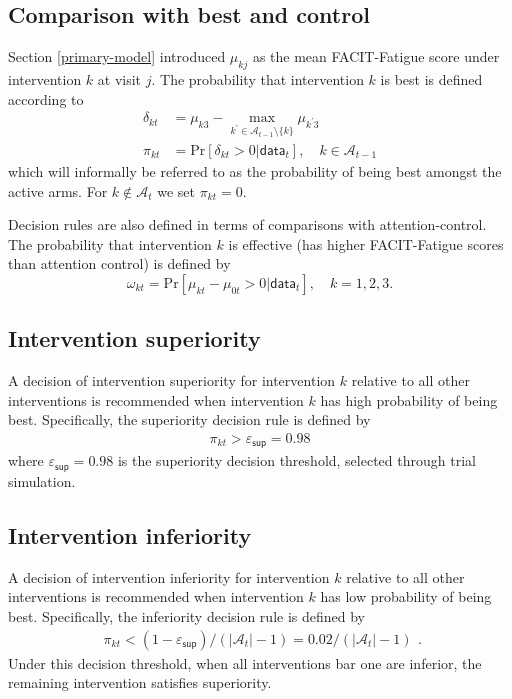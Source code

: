 \documentclass[11pt,parskip=half-]{scrartcl}
\begin{document}
\subsection{Comparison with best and control}\label{comparison-wth-best}

Section \ref{primary-model} introduced $\mu_{kj}$ as the mean FACIT-Fatigue score under intervention $k$ at visit $j$. The probability that intervention $k$ is best is defined according to
$$
  \begin{aligned}
    \delta_{kt} & = \mu_{k3} - \underset{k^\prime\in\mathcal{A}_{t-1}\setminus\{k\}}{\max}\mu_{k^\prime 3} \\
    \pi_{kt}    & = \text{Pr}[\delta_{kt}>0|\mathsf{data}_t], \quad k \in \mathcal{A}_{t-1}
  \end{aligned}
$$
which will informally be referred to as the probability of being best amongst the active arms. For $k\notin\mathcal{A}_t$ we set $\pi_{kt}=0$.

Decision rules are also defined in terms of comparisons with attention-control. The probability that intervention $k$ is effective (has higher FACIT-Fatigue scores than attention control) is defined by
$$
  \omega_{kt} = \text{Pr}[\mu_{kt} - \mu_{0t} > 0 | \mathsf{data}_t], \quad k =1,2,3.
$$

\subsection{Intervention superiority}\label{intervention-superiority}

A decision of intervention superiority for intervention $k$ relative to all other interventions is recommended when intervention $k$ has high probability of being best. Specifically, the superiority decision rule is defined by
$$
  \begin{aligned}
    \pi_{kt} > \varepsilon_{\mathsf{sup}} = 0.98
  \end{aligned}
$$
where $\varepsilon_{\mathsf{sup}} = 0.98$ is the superiority decision threshold, selected through trial simulation.

\subsection{Intervention inferiority}\label{trinterventioneatment-inferiority}

A decision of intervention inferiority for intervention $k$ relative to all other interventions is recommended when intervention $k$ has low probability of being best. Specifically, the inferiority decision rule is defined by
$$
  \begin{aligned}
    \pi_{kt} < (1 - \varepsilon_{\mathsf{sup}}) / (|\mathcal{A}_t| - 1) = 0.02 / (|\mathcal{A}_t| - 1)
  \end{aligned}.
$$
Under this decision threshold, when all interventions bar one are inferior, the remaining intervention satisfies superiority.
\end{document}
